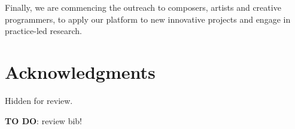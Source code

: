\documentclass{nime-alternate}
\begin{document}


Finally, we are commencing the outreach to composers, artists and creative programmers, to apply our platform to new innovative projects and engage in practice-led research.


\section{Acknowledgments}
Hidden for review.

%

 
\textbf{TO DO}: review bib!

\end{document}
